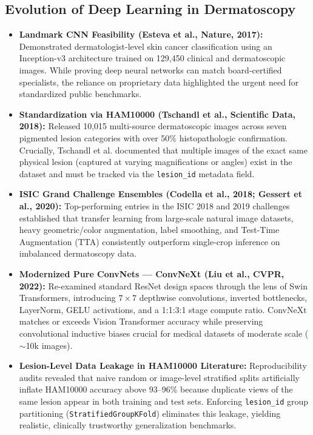 \documentclass[12pt,a4paper]{article}
\begin{document}
\subsection{Evolution of Deep Learning in Dermatoscopy}
\begin{itemize}[leftmargin=*]
    \item \textbf{Landmark CNN Feasibility (Esteva et al., Nature, 2017):} Demonstrated dermatologist-level skin cancer classification using an Inception-v3 architecture trained on 129,450 clinical and dermatoscopic images. While proving deep neural networks can match board-certified specialists, the reliance on proprietary data highlighted the urgent need for standardized public benchmarks.
    \item \textbf{Standardization via HAM10000 (Tschandl et al., Scientific Data, 2018):} Released 10,015 multi-source dermatoscopic images across seven pigmented lesion categories with over 50\% histopathologic confirmation. Crucially, Tschandl et al. documented that multiple images of the exact same physical lesion (captured at varying magnifications or angles) exist in the dataset and must be tracked via the \texttt{lesion\_id} metadata field.
    \item \textbf{ISIC Grand Challenge Ensembles (Codella et al., 2018; Gessert et al., 2020):} Top-performing entries in the ISIC 2018 and 2019 challenges established that transfer learning from large-scale natural image datasets, heavy geometric/color augmentation, label smoothing, and Test-Time Augmentation (TTA) consistently outperform single-crop inference on imbalanced dermatoscopy data.
    \item \textbf{Modernized Pure ConvNets --- ConvNeXt (Liu et al., CVPR, 2022):} Re-examined standard ResNet design spaces through the lens of Swin Transformers, introducing $7\times 7$ depthwise convolutions, inverted bottlenecks, LayerNorm, GELU activations, and a 1:1:3:1 stage compute ratio. ConvNeXt matches or exceeds Vision Transformer accuracy while preserving convolutional inductive biases crucial for medical datasets of moderate scale ($\sim$10k images).
    \item \textbf{Lesion-Level Data Leakage in HAM10000 Literature:} Reproducibility audits revealed that naive random or image-level stratified splits artificially inflate HAM10000 accuracy above 93--96\% because duplicate views of the same lesion appear in both training and test sets. Enforcing \texttt{lesion\_id} group partitioning (\texttt{StratifiedGroupKFold}) eliminates this leakage, yielding realistic, clinically trustworthy generalization benchmarks.
\end{itemize}
\end{document}
